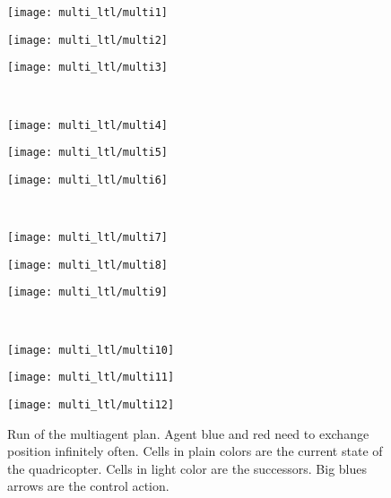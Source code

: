 \begin{figure}
  \newcommand*\FigVSkip{0.5em}
  \newcommand*\FigHSkip{0.1em}
  \newsavebox\FigBox
  \centering
  \begin{minipage}{0.3\textwidth}
    \centering
    \texttt{[image: multi\_ltl/multi1]}
  \end{minipage} 
  \begin{minipage}{0.3\textwidth}
    \centering
    \texttt{[image: multi\_ltl/multi2]}
  \end{minipage} 
  \begin{minipage}{0.3\textwidth}
    \centering
    \texttt{[image: multi\_ltl/multi3]}
  \end{minipage} 
  \\[\FigVSkip]%
  \begin{minipage}{0.3\textwidth}
    \centering
    \texttt{[image: multi\_ltl/multi4]}
  \end{minipage} 
  \begin{minipage}{0.3\textwidth}
    \centering
    \texttt{[image: multi\_ltl/multi5]}
  \end{minipage} 
  \begin{minipage}{0.3\textwidth}
    \centering
    \texttt{[image: multi\_ltl/multi6]}
  \end{minipage} 
  \\[\FigVSkip]%
  \begin{minipage}{0.3\textwidth}
    \centering
    \texttt{[image: multi\_ltl/multi7]}
  \end{minipage} 
  \begin{minipage}{0.3\textwidth}
    \centering
    \texttt{[image: multi\_ltl/multi8]}
  \end{minipage} 
  \begin{minipage}{0.3\textwidth}
    \centering
    \texttt{[image: multi\_ltl/multi9]}
  \end{minipage} 
  \\[\FigVSkip]%
  \begin{minipage}{0.3\textwidth}
    \centering
    \texttt{[image: multi\_ltl/multi10]}
  \end{minipage} 
  \begin{minipage}{0.3\textwidth}
    \centering
    \texttt{[image: multi\_ltl/multi11]}
  \end{minipage} 
  \begin{minipage}{0.3\textwidth}
    \centering
    \texttt{[image: multi\_ltl/multi12]}
  \end{minipage} 

\caption{Run of the multiagent plan. Agent blue and red need to exchange position infinitely often. Cells in plain colors are the current state of the quadricopter. Cells in light color are the successors. Big blues arrows are the control action.}
\label{fig:multi}
\end{figure}


